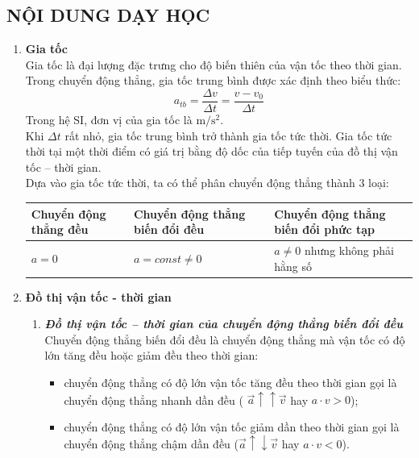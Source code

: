 \subsection{NỘI DUNG DẠY HỌC}
\begin{enumerate}[label=\bfseries\arabic*.]
	\item \textbf{Gia tốc}\\
	Gia tốc là đại lượng đặc trưng cho độ biến thiên của vận tốc theo thời gian. Trong chuyển động thẳng, gia tốc trung bình được xác định theo biểu thức:
	\begin{equation}
		a_{tb}=\dfrac{\Delta v}{\Delta t}=\dfrac{v-v_0}{\Delta t}
	\end{equation}
Trong hệ SI, đơn vị của gia tốc là $\si{\meter/\second^2}$.\\
Khi $\Delta t$ rất nhỏ, gia tốc trung bình trở thành gia tốc tức thời. Gia tốc tức thời tại một thời điểm có giá trị bằng độ dốc của tiếp tuyến của đồ thị vận tốc – thời gian.\\
Dựa vào gia tốc tức thời, ta có thể phân chuyển động thẳng thành 3 loại:
\begin{center}
	\begin{tabular}{|M{5cm}|M{5cm}|M{6cm}|}
		\hline
		Chuyển động thẳng đều & Chuyển động thẳng biến đổi đều & Chuyển động thẳng biến đổi phức tạp\\
		\hline
		$a=0$ & $a=const\neq0$ & $a\neq0$ nhưng không phải hằng số\\
		\hline
	\end{tabular}
\end{center}
\item \textbf{Đồ thị vận tốc - thời gian}\\
\begin{enumerate}[label=\bfseries \itshape 2.\arabic*., nolistsep]
	\item  \textbf{\textit{Đồ thị vận tốc – thời gian của chuyển động thẳng biến đổi đều}}\\
	Chuyển động thẳng biến đổi đều là chuyển động thẳng mà vận tốc có độ lớn tăng đều hoặc giảm đều theo thời gian:
	\begin{itemize}
		\item chuyển động thẳng có độ lớn vận tốc tăng đều theo thời gian gọi là chuyển động thẳng nhanh dần đều ( $\vec{a}\uparrow\uparrow\vec{v}$ hay $a\cdot v>0$);
		\item chuyển động thẳng có độ lớn vận tốc giảm dần theo thời gian gọi là chuyển động thẳng chậm dần đều ($\vec{a}\uparrow\downarrow\vec{v}$  hay  $a\cdot v<0$).
		

\end{itemize}
\end{enumerate}
\end{enumerate}
